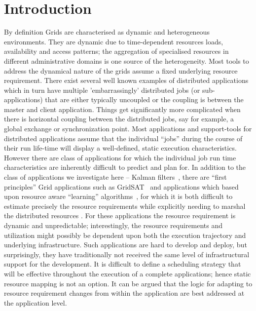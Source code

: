 \documentclass[conference,final]{IEEEtran}
\newcommand{\jhanote}[1]{ {\textcolor{red} { ***Jha: #1 }}}
\newcommand{\yyenote}[1]{ {\textcolor{blue} { ***yye00: #1 }}}
\newcommand{\jhanote}[1]{}
\newcommand{\yyenote}[1]{}
\begin{document}
\section{Introduction}


By definition Grids are characterised as dynamic and heterogeneous
environments.  They are dynamic due to time-dependent resources loads,
availability and access patterns; the aggregation of specialised
resources in different administrative domains is one source of the
heterogeneity.  Most tools to address the dynamical nature of the
grids assume a fixed underlying resource requirement.  There exist
several well known examples of distributed applications which in turn
have multiple 'embarrassingly' distributed jobs (or sub-applications)
that are either typically uncoupled or the coupling is between the
master and client application.  Things get significantly more
complicated when there is horizontal coupling between the distributed
jobs, say for example, a global exchange or synchronization point.
Most applications and support-tools for distributed applications
assume that the individual ``jobs'' during the course of their run
life-time will display a well-defined, static execution
characteristics.  However there are class of applications for which
the individual job run time characteristics are inherently difficult
to predict and plan for.  In addition to the class of applications we
investigate here -- Kalman filters~\cite{DataAssim, KalmanPaper},
there are ``first principles'' Grid applications such as
GridSAT~\cite{gridsat03} and applications which based upon resource
aware ``learning'' algorithms~\cite{ majority_voting}, for which it is
both difficult to estimate precisely the resource requirements while
explicitly needing to marshal the distributed resources . For these
applications the resource requirement is dynamic and unpredictable;
interestingly, the resource requirements and utilization might
possibly be dependent upon both the execution trajectory and
underlying infrastructure. Such applications are hard to develop and
deploy, but surprisingly, they have traditionally not received the
same level of infrastructural support for the development. It is
difficult to define a scheduling strategy that will be effective
throughout the execution of a complete applications; hence static
resource mapping is not an option.  It can be argued that the logic
for adapting to resource requirement changes from within the
application are best addressed at the application level.
\end{document}
